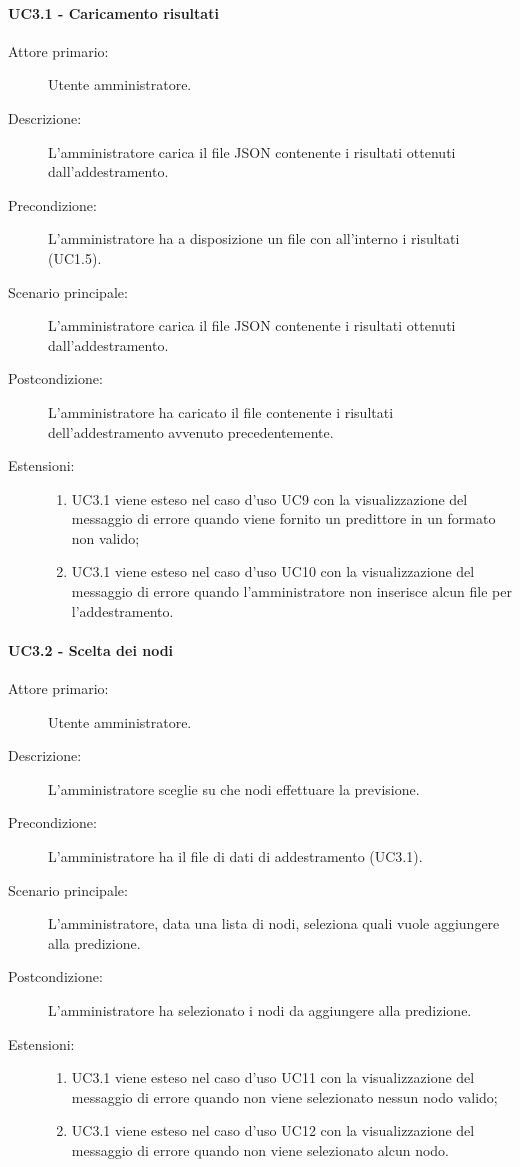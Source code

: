 \paragraph{UC3.1 - Caricamento risultati}
\label{sssec:uc3.1}
\begin{description}
  \item[Attore primario:] Utente amministratore.
  \item[Descrizione:] L'amministratore carica il file JSON contenente i risultati ottenuti dall'addestramento.
  \item[Precondizione:] L'amministratore ha a disposizione un file con all'interno i risultati (UC1.5).
  \item[Scenario principale:] L'amministratore carica il file JSON contenente i risultati ottenuti dall'addestramento.
  \item[Postcondizione:] L'amministratore ha caricato il file contenente i risultati dell'addestramento avvenuto precedentemente.
  \item[Estensioni:]
  \begin{enumerate}
	\item UC3.1 viene esteso nel caso d'uso UC9 con la visualizzazione del messaggio di errore quando viene fornito un predittore in un formato non valido;
	\item UC3.1 viene esteso nel caso d'uso UC10 con la visualizzazione del messaggio di errore quando l'amministratore non inserisce alcun file per l'addestramento.
  \end{enumerate}
\end{description}

\paragraph{UC3.2 - Scelta dei nodi}
\label{sssec:uc3.2}
\begin{description}
  \item[Attore primario:] Utente amministratore.
  \item[Descrizione:] L'amministratore sceglie su che nodi effettuare la previsione.
  \item[Precondizione:] L'amministratore ha il file di dati di addestramento (UC3.1).
  \item[Scenario principale:] L'amministratore, data una lista di nodi, seleziona quali vuole aggiungere alla predizione.
  \item[Postcondizione:] L'amministratore ha selezionato i nodi da aggiungere alla predizione.
  \item[Estensioni:]
  \begin{enumerate}
	\item UC3.1 viene esteso nel caso d'uso UC11 con la visualizzazione del messaggio di errore quando non viene selezionato nessun nodo valido;
	\item UC3.1 viene esteso nel caso d'uso UC12 con la visualizzazione del messaggio di errore quando non viene selezionato alcun nodo.
  \end{enumerate}
\end{description}


